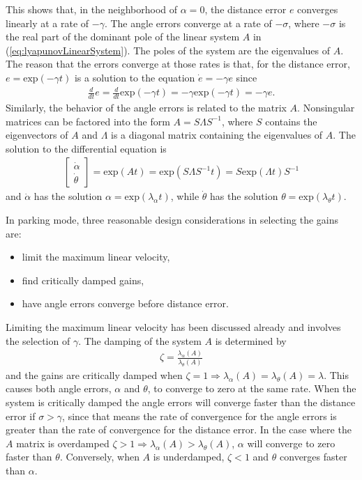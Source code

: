 This shows that, in the neighborhood of $\alpha=0$, the distance error $e$ converges linearly at a rate of $-\gamma$. The angle errors converge at a rate of $-\sigma$, where $-\sigma$ is the real part of the dominant pole of the linear system $A$ in (\ref{eq:lyapunovLinearSystem}). The poles of the system are the eigenvalues of $A$. The reason that the errors converge at those rates is that, for the distance error, $e=\text{exp}(-\gamma t)$ is a solution to the equation $\dot{e}=-\gamma e$ since 
\begin{align*}
\tfrac{d}{dt}e=\tfrac{d}{dt}\text{exp}(-\gamma t) = -\gamma \text{exp}(-\gamma t)=-\gamma e.
\end{align*}
Similarly, the behavior of the angle errors is related to the matrix $A$. Nonsingular matrices can be factored into the form $A=S\Lambda S^{-1}$, where $S$ contains the eigenvectors of $A$ and $\Lambda$ is a diagonal matrix containing the eigenvalues of $A$. The solution to the differential equation is
\begin{align*}
\left[\begin{array}{c} \dot{\alpha} \\ \dot{\theta} \end{array}\right] = \text{exp}(At)=\text{exp}(S\Lambda S^{-1}t)=S\text{exp}(\Lambda t)S^{-1}
\end{align*}
and $\dot{\alpha}$ has the solution $\alpha=\text{exp}(\lambda_\alpha t)$, while $\dot{\theta}$ has the solution $\theta=\text{exp}(\lambda_\theta t)$.

In parking mode, three reasonable design considerations in selecting the gains are:
\begin{itemize}
\item limit the maximum linear velocity,
\item find critically damped gains,
\item have angle errors converge before distance error.
\end{itemize}
Limiting the maximum linear velocity has been discussed already and involves the selection of $\gamma$. The damping of the system $A$ is determined by
\begin{align*}
\zeta = \frac{\lambda_\alpha(A)}{\lambda_\theta(A)}
\end{align*}
and the gains are critically damped when $\zeta = 1 \Rightarrow \lambda_\alpha(A)=\lambda_\theta(A)=\lambda$. This causes both angle errors, $\alpha$ and $\theta$, to converge to zero at the same rate. When the system is critically damped the angle errors will converge faster than the distance error if $\sigma>\gamma$, since that means the rate of convergence for the angle errors is greater than the rate of convergence for the distance error. In the case where the $A$ matrix is overdamped $\zeta > 1 \Rightarrow \lambda_\alpha(A) > \lambda_\theta(A)$, $\alpha$ will converge to zero faster than $\theta$. Conversely, when $A$ is underdamped, $\zeta < 1$ and $\theta$ converges faster than $\alpha$.

